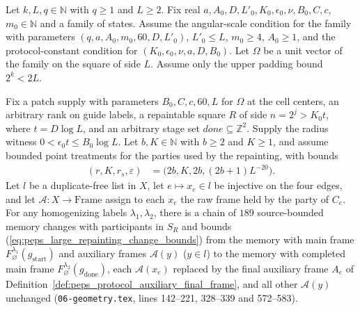\begin{lemma}
    \label{thm:peps_protocol_large_repainting_chain}
    \leanok
    Let $k,L,q\in\mathbb N$ with $q\ge1$ and $L\ge2$. Fix real
    $a,A_0,D,L'_0,K_0,\epsilon_0,\nu,B_0,C,c$, $m_0\in\mathbb N$ and a family
    of states. Assume the angular-scale condition for the family with parameters
    $(q,a,A_0,m_0,60,D,L'_0)$, $L'_0\le L$, $m_0\ge4$, $A_0\ge1$,
    and the protocol-constant condition for $(K_0,\epsilon_0,\nu,a,D,B_0)$.
    Let $\Omega$ be a unit vector of the family on the square of side $L$.
    Assume only the upper padding bound $2^k<2L$.

    Fix a patch supply with parameters $B_0,C,c,60,L$ for $\Omega$ at the
    cell centers, an arbitrary rank on guide labels, a repaintable square $R$
    of side $n=2^j>K_0t$, where $t=D\log L$, and an arbitrary stage set
    $\mathit{done}\subseteq\mathbb Z^2$. Supply the radius witness
    $0<\epsilon_0t\le B_0\log L$. Let $b,K\in\mathbb N$ with $b\ge2$ and
    $K\ge1$, and assume bounded point treatments for the parties used by
    the repainting, with bounds
    \begin{align}
        (r,K,r_s,\varepsilon)
         & =\bigl(2b,K,2b,(2b+1)L^{-20}\bigr).
        \label{eq:peps_large_repainting_change_bounds}
    \end{align}
    Let $l$ be a duplicate-free list in $X$, let $e\mapsto x_e\in l$ be injective on the four edges, and let $\mathcal A\colon X\to\mathrm{Frame}$ assign to each $x_e$ the raw frame held by the party of $C_e$. For any homogenizing labels $\lambda_1,\lambda_2$, there is a chain of $189$ source-bounded memory changes with participants in $S_R$ and bounds (\ref{eq:peps_large_repainting_change_bounds}) from the memory with main frame $F_\varnothing^{\lambda_1}(g_{\mathrm{start}})$ and auxiliary frames $\mathcal A(y)$ ($y\in l$) to the memory with completed main frame $F_\varnothing^{\lambda_2}(g_{\mathrm{done}})$, each $\mathcal A(x_e)$ replaced by the final auxiliary frame $A_e$ of Definition~\ref{def:peps_protocol_auxiliary_final_frame}, and all other $\mathcal A(y)$ unchanged (\texttt{06-geometry.tex}, lines 142--221, 328--339 and 572--583).
\end{lemma}


